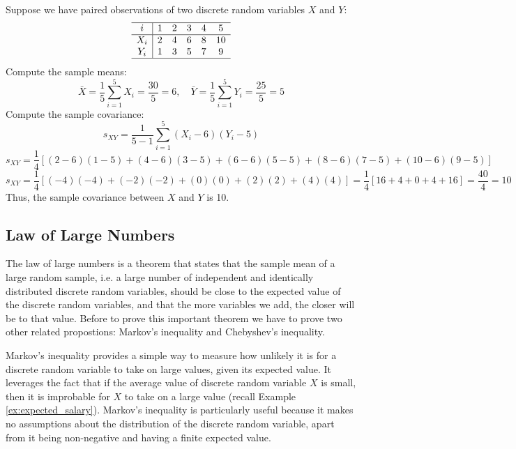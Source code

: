 \begin{example}
Suppose we have paired observations of two discrete random variables \( X \) and \( Y \):
\[
\begin{array}{c|ccccc}
\hline
i & 1 & 2 & 3 & 4 & 5 \\
\hline
X_i & 2 & 4 & 6 & 8 & 10 \\
Y_i & 1 & 3 & 5 & 7 & 9 \\
\hline
\end{array}
\]
Compute the sample means:
\[
\bar{X} = \frac{1}{5} \sum_{i=1}^{5} X_i = \frac{30}{5} = 6, \quad \bar{Y} = \frac{1}{5} \sum_{i=1}^{5} Y_i = \frac{25}{5} = 5
\]
Compute the sample covariance:
\[
s_{XY} = \frac{1}{5 - 1} \sum_{i=1}^{5} \left( X_i - 6 \right) \left( Y_i - 5 \right)
\]
\[
s_{XY} = \frac{1}{4} \left[ (2 - 6)(1 - 5) + (4 - 6)(3 - 5) + (6 - 6)(5 - 5) + (8 - 6)(7 - 5) + (10 - 6)(9 - 5) \right]
\]
\[
s_{XY} = \frac{1}{4} \left[ ( -4 )( -4 ) + ( -2 )( -2 ) + ( 0 )( 0 ) + ( 2 )( 2 ) + ( 4 )( 4 ) \right] = \frac{1}{4} \left[ 16 + 4 + 0 + 4 + 16 \right] = \frac{40}{4} = 10
\]
Thus, the sample covariance between \( X \) and \( Y \) is 10.
\end{example}


\subsection{Law of Large Numbers}

The law of large numbers is a theorem that states that the sample mean of a large random sample, i.e. a large number of independent and identically distributed discrete random variables, should be close to the expected value of the discrete random variables, and that the more variables we add, the closer will be to that value. Before to prove this important theorem we have to prove two other related propostions: Markov's inequality and Chebyshev's inequality.

Markov's inequality provides a simple way to measure how unlikely it is for a discrete random variable to take on large values, given its expected value. It leverages the fact that if the average value of discrete random variable $X$ is small, then it is improbable for $X$ to take on a large value (recall Example \ref{ex:expected_salary}). Markov's inequality is particularly useful because it makes no assumptions about the distribution of the discrete random variable, apart from it being non-negative and having a finite expected value.

